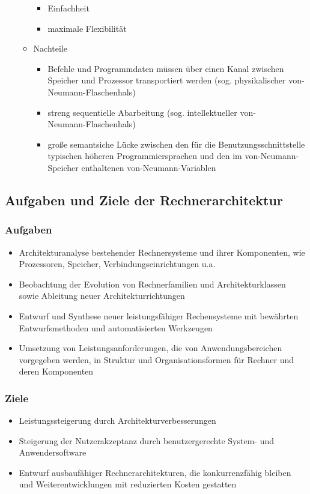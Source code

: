 \begin{itemize}
\begin{itemize}
\begin{itemize}
			\item Einfachheit
			\item maximale Flexibilität
		\end{itemize}
		\item Nachteile
		\begin{itemize}
			\item Befehle und Programmdaten müssen über einen Kanal zwischen \\Speicher und Prozessor transportiert werden (sog. physikalischer von- \\Neumann-Flaschenhals)
			\item streng sequentielle Abarbeitung (sog. intellektueller von-\\Neumann-Flaschenhals)
			\item große semantsiche Lücke zwischen den für die Benutzungsschnittstelle typischen höheren Programmiersprachen und den im von-Neumann-Speicher enthaltenen von-Neumann-Variablen
		\end{itemize}
	\end{itemize}
\end{itemize}
\subsection{Aufgaben und Ziele der Rechnerarchitektur}
\subsubsection{Aufgaben}
\begin{itemize}
	\item Architekturanalyse bestehender Rechnersysteme und ihrer Komponenten, wie Prozessoren, Speicher, Verbindungseinrichtungen u.a.
	\item Beobachtung der Evolution von Rechnerfamilien und Architekturklassen sowie Ableitung neuer Architekturrichtungen 
	\item Entwurf und Synthese neuer leistungsfähiger Rechensysteme mit bewährten Entwurfsmethoden und automatisierten Werkzeugen
	\item Umsetzung von Leistungsanforderungen, die von Anwendungsbereichen vorgegeben werden, in Struktur und Organisationsformen für Rechner und deren Komponenten
\end{itemize}
\subsubsection{Ziele}
\begin{itemize}
	\item Leistungssteigerung durch Architekturverbesserungen
	\item Steigerung der Nutzerakzeptanz durch benutzergerechte System- und Anwendersoftware
	\item Entwurf ausbaufähiger Rechnerarchitekturen, die konkurrenzfähig bleiben und Weiterentwicklungen mit reduzierten Kosten gestatten
\end{itemize}
